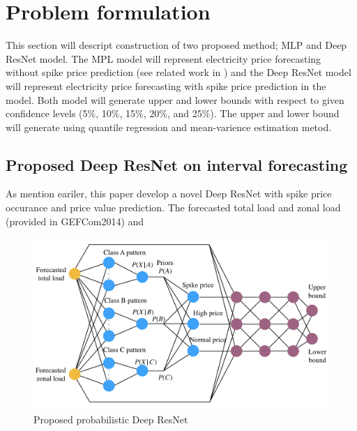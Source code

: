 \documentclass[review]{elsarticle}
\begin{document}
  \section{Problem formulation}
    This section will descript construction of two proposed method; MLP and Deep ResNet model. The MPL model will represent electricity price forecasting without spike price prediction (see related work in \cite{Dudek2016}) and the Deep ResNet model will represent electricity price forecasting with spike price prediction in the model. Both model will generate upper and lower bounds with respect to given confidence levels (5$\%$, 10$\%$, 15$\%$, 20$\%$, and 25$\%$). The upper and lower bound will generate using quantile regression and mean-varience estimation metod.

    \subsection{Proposed Deep ResNet on interval forecasting}
      As mention eariler, this paper develop a novel Deep ResNet with spike price occurance and price  value prediction. The forecasted total load and zonal load (provided in GEFCom2014) and

      \begin{figure}[H]
        \includegraphics[width=12cm]{proposed_PDRNN}
        \caption{Proposed probabilistic Deep ResNet}
        \label{Fig:proposed_PDRNN}
        \centering
      \end{figure}
\end{document}
